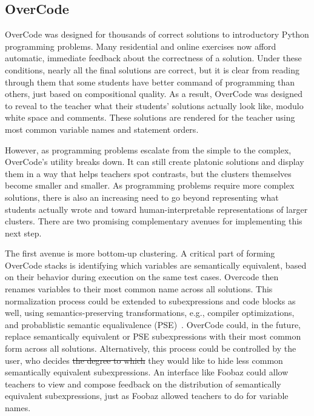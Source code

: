 \documentclass[12pt,twoside]{mitthesis}
\providecommand{\DIFaddtex}[1]{{\protect\color{blue}\uwave{#1}}} %
\providecommand{\DIFdeltex}[1]{{\protect\color{red}\sout{#1}}}                      %
\providecommand{\DIFaddbegin}{} %
\providecommand{\DIFaddend}{} %
\providecommand{\DIFdelbegin}{} %
\providecommand{\DIFdelend}{} %
\providecommand{\DIFadd}[1]{\texorpdfstring{\DIFaddtex{#1}}{#1}} %
\providecommand{\DIFdel}[1]{\texorpdfstring{\DIFdeltex{#1}}{}} %
\begin{document}
\subsection{OverCode}

OverCode was designed for thousands of correct solutions to introductory Python programming problems. Many residential and online exercises now afford automatic, immediate feedback about the correctness of a solution. Under these conditions, nearly all the final solutions are correct, but it is clear from reading through them that some students have better command of programming than others, just based on compositional quality. As a result, OverCode was designed to reveal to the teacher what their students' solutions actually look like, modulo white space and comments. These solutions are rendered for the teacher using most common variable names and statement orders.%

However, as programming problems escalate from the simple to the complex, OverCode's utility breaks down. It can still create platonic solutions and display them in a way that helps teachers spot contrasts, but the clusters themselves become smaller and smaller. As programming problems require more complex solutions, there is also an increasing need to go beyond representing what students actually wrote and toward human-interpretable representations of larger clusters. There are two promising complementary avenues for implementing this next step.

The first avenue is more bottom-up clustering. A critical part of forming OverCode stacks is identifying which variables are semantically equivalent, based on their behavior during execution on the same test cases. Overcode then renames variables to their most common name across all solutions. This normalization process could be extended to subexpressions and code blocks as well, using semantics-preserving transformations, e.g., compiler optimizations, and probablistic semantic equalivalence (PSE)~\cite{codewebs}. OverCode could, in the future, replace semantically equivalent or PSE subexpressions with their most common form across all solutions. Alternatively, this process could be controlled by the user, who decides \DIFdelbegin \DIFdel{the degree to which }\DIFdelend \DIFaddbegin \DIFadd{how much }\DIFaddend they would like to hide less common semantically equivalent subexpressions. An interface like Foobaz could allow teachers to view and compose feedback on the distribution of semantically equivalent subexpressions, just as Foobaz allowed teachers to do for variable names.
\end{document}
